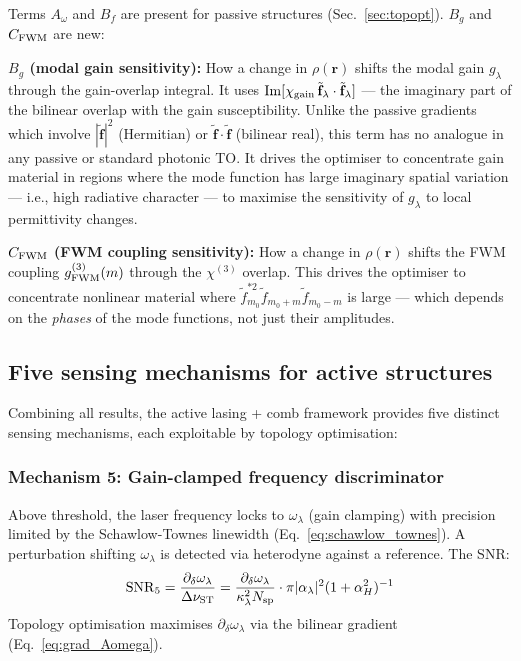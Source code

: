 \documentclass[12pt]{article}
\newcommand{\tf}{\tilde{\mathbf{f}}}
\begin{document}
Terms $A_\omega$ and $B_f$ are present for passive structures
(Sec.~\ref{sec:topopt}).  $B_g$ and $C_{\rm FWM}$ are new:

\textbf{$B_g$ (modal gain sensitivity):}  How a change in $\rho(\mathbf{r})$
shifts the modal gain $g_\lambda$ through the gain-overlap integral.
It uses $\mathrm{Im}[\chi_{\rm gain}\,\tf_\lambda\cdot\tf_\lambda]$ ---
the imaginary part of the bilinear overlap with the gain susceptibility.
Unlike the passive gradients which involve $|\tf|^2$ (Hermitian) or
$\tf\cdot\tf$ (bilinear real), this term has no analogue in any passive
or standard photonic TO.  It drives the optimiser to concentrate gain
material in regions where the mode function has large imaginary spatial
variation --- i.e., high radiative character --- to maximise the
sensitivity of $g_\lambda$ to local permittivity changes.

\textbf{$C_{\rm FWM}$ (FWM coupling sensitivity):}  How a change in
$\rho(\mathbf{r})$ shifts the FWM coupling $g^{(3)}_{\rm FWM}(m)$
through the $\chi^{(3)}$ overlap.  This drives the optimiser to
concentrate nonlinear material where $\tilde{f}_{m_0}^{*2}\tilde{f}_{m_0+m}
\tilde{f}_{m_0-m}$ is large --- which depends on the \emph{phases} of the
mode functions, not just their amplitudes.

\subsection{Five sensing mechanisms for active structures}

Combining all results, the active lasing + comb framework provides five
distinct sensing mechanisms, each exploitable by topology optimisation:

\subsubsection*{Mechanism 5: Gain-clamped frequency discriminator}

Above threshold, the laser frequency locks to $\omega_\lambda$ (gain
clamping) with precision limited by the Schawlow-Townes linewidth
(Eq.~\ref{eq:schawlow_townes}).  A perturbation shifting $\omega_\lambda$
is detected via heterodyne against a reference.  The SNR:
\begin{equation}
  \mathrm{SNR}_5 = \frac{\partial_\delta\omega_\lambda}{\Delta\nu_{\rm ST}}
  = \frac{\partial_\delta\omega_\lambda}{\kappa_\lambda^2 N_{\rm sp}}
  \cdot\pi|\alpha_\lambda|^2(1+\alpha_H^2)^{-1}
  \label{eq:SNR5}
\end{equation}
Topology optimisation maximises $\partial_\delta\omega_\lambda$ via the
bilinear gradient (Eq.~\ref{eq:grad_Aomega}).
\end{document}
